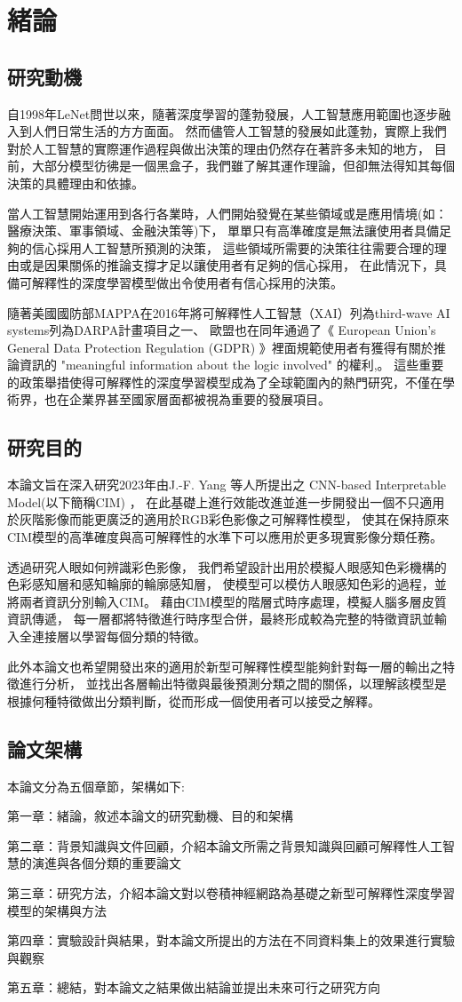 \documentclass[class=NCU_thesis, crop=false]{standalone}
\begin{document}
\chapter{緒論}
\section{研究動機}

自1998年LeNet\cite{726791}問世以來，隨著深度學習的蓬勃發展，人工智慧應用範圍也逐步融入到人們日常生活的方方面面。
然而儘管人工智慧的發展如此蓬勃，實際上我們對於人工智慧的實際運作過程與做出決策的理由仍然存在著許多未知的地方，
目前，大部分模型彷彿是一個黑盒子，我們雖了解其運作理論，但卻無法得知其每個決策的具體理由和依據。

當人工智慧開始運用到各行各業時，人們開始發覺在某些領域或是應用情境(如：醫療決策、軍事領域、金融決策等)下，
單單只有高準確度是無法讓使用者具備足夠的信心採用人工智慧所預測的決策，
這些領域所需要的決策往往需要合理的理由或是因果關係的推論支撐才足以讓使用者有足夠的信心採用，
在此情況下，具備可解釋性的深度學習模型做出令使用者有信心採用的決策。

隨著美國國防部MAPPA在2016年將可解釋性人工智慧（XAI）列為third-wave AI systems列為DARPA計畫項目之一\cite{DARPA}、
歐盟也在同年通過了《 European Union's General Data Protection Regulation (GDPR) 》裡面規範使用者有獲得有關於推論資訊的 "meaningful information about the logic involved" 的權利\cite{GDPR2016a},\cite{doi:10.1080/13600834.2019.1573501}。 這些重要的政策舉措使得可解釋性的深度學習模型成為了全球範圍內的熱門研究，不僅在學術界，也在企業界甚至國家層面都被視為重要的發展項目。

\pagebreak
\section{研究目的}
本論文旨在深入研究2023年由J.-F. Yang 等人所提出之 CNN-based Interpretable Model(以下簡稱CIM) \cite{YangCNNInterpretable}，
在此基礎上進行效能改進並進一步開發出一個不只適用於灰階影像而能更廣泛的適用於RGB彩色影像之可解釋性模型，
使其在保持原來CIM模型的高準確度與高可解釋性的水準下可以應用於更多現實影像分類任務。

透過研究人眼如何辨識彩色影像，
我們希望設計出用於模擬人眼感知色彩機構的色彩感知層和感知輪廓的輪廓感知層，
使模型可以模仿人眼感知色彩的過程，並將兩者資訊分別輸入CIM。
藉由CIM模型的階層式時序處理，模擬人腦多層皮質資訊傳遞，
每一層都將特徵進行時序型合併，最終形成較為完整的特徵資訊並輸入全連接層以學習每個分類的特徵。

此外本論文也希望開發出來的適用於新型可解釋性模型能夠針對每一層的輸出之特徵進行分析，
並找出各層輸出特徵與最後預測分類之間的關係，以理解該模型是根據何種特徵做出分類判斷，從而形成一個使用者可以接受之解釋。

\pagebreak
\section{論文架構}

本論文分為五個章節，架構如下:

第一章：緒論，敘述本論文的研究動機、目的和架構

第二章：背景知識與文件回顧，介紹本論文所需之背景知識與回顧可解釋性人工智慧的演進與各個分類的重要論文

第三章：研究方法，介紹本論文對以卷積神經網路為基礎之新型可解釋性深度學習模型的架構與方法

第四章：實驗設計與結果，對本論文所提出的方法在不同資料集上的效果進行實驗與觀察

第五章：總結，對本論文之結果做出結論並提出未來可行之研究方向
\end{document}
